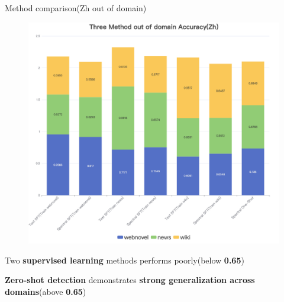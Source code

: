 \documentclass[serif]{beamer}
\begin{document}
\begin{frame}{Method comparison(Zh out of domain)}
\begin{figure}
    \centering
    \includegraphics[width=0.5\linewidth]{images/Three Method out of domain Accuracy(Zh).png}
\end{figure}
\vspace{-0.5em}
\small{
\begin{item}
    \item Two \textbf{supervised learning} methods performs poorly(below \textbf{0.65})

    \item \textbf{Zero-shot detection} demonstrates \textbf{strong generalization across domains}(above \textbf{0.65})
\end{item}
}
\end{frame}
\end{document}
